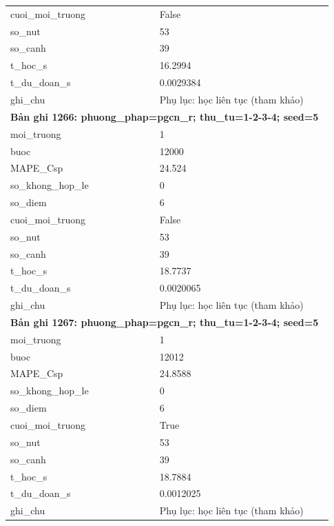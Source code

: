 \begin{longtable}{p{0.43\linewidth}p{0.50\linewidth}}
cuoi\_\allowbreak moi\_\allowbreak truong & False \\
so\_\allowbreak nut & 53 \\
so\_\allowbreak canh & 39 \\
t\_\allowbreak hoc\_\allowbreak s & 16.2994 \\
t\_\allowbreak du\_\allowbreak doan\_\allowbreak s & 0.0029384 \\
ghi\_\allowbreak chu & Phụ lục: học liên tục (tham khảo) \\
\midrule
\multicolumn{2}{p{0.95\linewidth}}{\textbf{Bản ghi 1266: phuong\_phap=pgcn\_r; thu\_tu=1-2-3-4; seed=5}} \\
moi\_\allowbreak truong & 1 \\
buoc & 12000 \\
MAPE\_\allowbreak Csp & 24.524 \\
so\_\allowbreak khong\_\allowbreak hop\_\allowbreak le & 0 \\
so\_\allowbreak diem & 6 \\
cuoi\_\allowbreak moi\_\allowbreak truong & False \\
so\_\allowbreak nut & 53 \\
so\_\allowbreak canh & 39 \\
t\_\allowbreak hoc\_\allowbreak s & 18.7737 \\
t\_\allowbreak du\_\allowbreak doan\_\allowbreak s & 0.0020065 \\
ghi\_\allowbreak chu & Phụ lục: học liên tục (tham khảo) \\
\midrule
\multicolumn{2}{p{0.95\linewidth}}{\textbf{Bản ghi 1267: phuong\_phap=pgcn\_r; thu\_tu=1-2-3-4; seed=5}} \\
moi\_\allowbreak truong & 1 \\
buoc & 12012 \\
MAPE\_\allowbreak Csp & 24.8588 \\
so\_\allowbreak khong\_\allowbreak hop\_\allowbreak le & 0 \\
so\_\allowbreak diem & 6 \\
cuoi\_\allowbreak moi\_\allowbreak truong & True \\
so\_\allowbreak nut & 53 \\
so\_\allowbreak canh & 39 \\
t\_\allowbreak hoc\_\allowbreak s & 18.7884 \\
t\_\allowbreak du\_\allowbreak doan\_\allowbreak s & 0.0012025 \\
ghi\_\allowbreak chu & Phụ lục: học liên tục (tham khảo) \\

\end{longtable}
